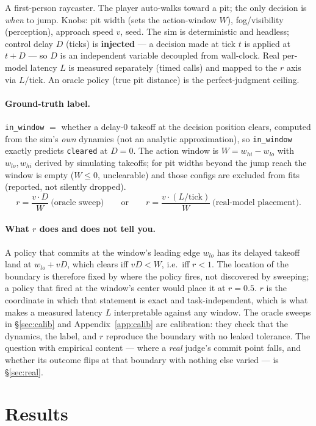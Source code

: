 \documentclass[11pt]{article}
\newcommand{\code}[1]{\texttt{#1}}
\begin{document}
A first-person raycaster. The player auto-walks toward a pit; the only decision
is \emph{when} to jump. Knobs: pit width (sets the action-window $W$),
fog/visibility (perception), approach speed $v$, seed. The sim is deterministic
and headless; control delay $D$ (ticks) is \textbf{injected} --- a decision made
at tick $t$ is applied at $t{+}D$ --- so $D$ is an independent variable
decoupled from wall-clock. Real per-model latency $L$ is measured separately
(timed calls) and mapped to the $r$ axis via $L/\text{tick}$. An oracle policy
(true pit distance) is the perfect-judgment ceiling.

\paragraph{Ground-truth label.} \code{in\_window} $=$ whether a delay-0 takeoff
at the decision position clears, computed from the sim's \emph{own} dynamics
(not an analytic approximation), so \code{in\_window} exactly predicts
\code{cleared} at $D{=}0$. The action window is $W = w_{hi} - w_{lo}$ with
$w_{lo}, w_{hi}$ derived by simulating takeoffs; for pit widths beyond the jump
reach the window is empty ($W \le 0$, unclearable) and those configs are
excluded from fits (reported, not silently dropped).
\[
  r = \frac{v \cdot D}{W}\ \text{(oracle sweep)}
  \qquad\text{or}\qquad
  r = \frac{v \cdot (L/\text{tick})}{W}\ \text{(real-model placement).}
\]

\paragraph{What $r$ does and does not tell you.} A policy that commits at the
window's leading edge $w_{lo}$ has its delayed takeoff land at $w_{lo} + vD$,
which clears iff $vD < W$, i.e.\ iff $r < 1$. The location of the boundary is
therefore fixed by where the policy fires, not discovered by sweeping; a policy
that fired at the window's center would place it at $r = 0.5$. $r$ is the
coordinate in which that statement is exact and task-independent, which is what
makes a measured latency $L$ interpretable against any window. The oracle
sweeps in \S\ref{sec:calib} and Appendix~\ref{app:calib} are calibration: they check that the dynamics, the label,
and $r$ reproduce the boundary with no leaked tolerance. The question with
empirical content --- where a \emph{real} judge's commit point falls, and
whether its outcome flips at that boundary with nothing else varied --- is
\S\ref{sec:real}.

\section{Results}
\end{document}
